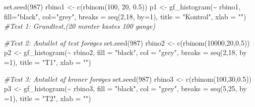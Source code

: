 \documentclass[
]{article}
\newenvironment{Shaded}{\begin{snugshade}}{\end{snugshade}}
\newcommand{\AttributeTok}[1]{\textcolor[rgb]{0.77,0.63,0.00}{#1}}
\newcommand{\CommentTok}[1]{\textcolor[rgb]{0.56,0.35,0.01}{\textit{#1}}}
\newcommand{\DecValTok}[1]{\textcolor[rgb]{0.00,0.00,0.81}{#1}}
\newcommand{\FloatTok}[1]{\textcolor[rgb]{0.00,0.00,0.81}{#1}}
\newcommand{\FunctionTok}[1]{\textcolor[rgb]{0.00,0.00,0.00}{#1}}
\newcommand{\NormalTok}[1]{#1}
\newcommand{\OtherTok}[1]{\textcolor[rgb]{0.56,0.35,0.01}{#1}}
\newcommand{\SpecialCharTok}[1]{\textcolor[rgb]{0.00,0.00,0.00}{#1}}
\newcommand{\StringTok}[1]{\textcolor[rgb]{0.31,0.60,0.02}{#1}}
\begin{document}
\begin{Shaded}
\begin{Highlighting}[]
\FunctionTok{set.seed}\NormalTok{(}\DecValTok{987}\NormalTok{)}
\NormalTok{rbino1 }\OtherTok{\textless{}{-}} \FunctionTok{c}\NormalTok{(}\FunctionTok{rbinom}\NormalTok{(}\DecValTok{100}\NormalTok{, }\DecValTok{20}\NormalTok{, }\FloatTok{0.5}\NormalTok{))}
\NormalTok{p1 }\OtherTok{\textless{}{-}} \FunctionTok{gf\_histogram}\NormalTok{(}\SpecialCharTok{\textasciitilde{}}\NormalTok{ rbino1, }\AttributeTok{fill=}\StringTok{"black"}\NormalTok{, }\AttributeTok{col=}\StringTok{"grey"}\NormalTok{, }\AttributeTok{breaks =} \FunctionTok{seq}\NormalTok{(}\DecValTok{2}\NormalTok{,}\DecValTok{18}\NormalTok{, }\AttributeTok{by=}\DecValTok{1}\NormalTok{), }\AttributeTok{title =} \StringTok{"Kontrol"}\NormalTok{, }\AttributeTok{xlab =} \StringTok{""}\NormalTok{) }\CommentTok{\#Test 1: Grundtest,(20 mønter kastes 100 gange)}


\CommentTok{\#Test 2: Antallet af test forøges}
\FunctionTok{set.seed}\NormalTok{(}\DecValTok{987}\NormalTok{)}
\NormalTok{rbino2 }\OtherTok{\textless{}{-}} \FunctionTok{c}\NormalTok{(}\FunctionTok{rbinom}\NormalTok{(}\DecValTok{10000}\NormalTok{,}\DecValTok{20}\NormalTok{,}\FloatTok{0.5}\NormalTok{))}
\NormalTok{p2 }\OtherTok{\textless{}{-}} \FunctionTok{gf\_histogram}\NormalTok{(}\SpecialCharTok{\textasciitilde{}}\NormalTok{ rbino2, }\AttributeTok{fill =} \StringTok{"black"}\NormalTok{, }\AttributeTok{col =} \StringTok{"grey"}\NormalTok{, }\AttributeTok{breaks =} \FunctionTok{seq}\NormalTok{(}\DecValTok{2}\NormalTok{,}\DecValTok{18}\NormalTok{, }\AttributeTok{by =}\DecValTok{1}\NormalTok{), }\AttributeTok{title =} \StringTok{"T1"}\NormalTok{, }\AttributeTok{xlab =} \StringTok{""}\NormalTok{) }

\CommentTok{\#Test 3: Antallet af kroner forøges}
\FunctionTok{set.seed}\NormalTok{(}\DecValTok{987}\NormalTok{)}
\NormalTok{rbino3 }\OtherTok{\textless{}{-}} \FunctionTok{c}\NormalTok{(}\FunctionTok{rbinom}\NormalTok{(}\DecValTok{100}\NormalTok{,}\DecValTok{30}\NormalTok{,}\FloatTok{0.5}\NormalTok{))}
\NormalTok{p3 }\OtherTok{\textless{}{-}} \FunctionTok{gf\_histogram}\NormalTok{(}\SpecialCharTok{\textasciitilde{}}\NormalTok{ rbino3, }\AttributeTok{fill =} \StringTok{"black"}\NormalTok{, }\AttributeTok{col =} \StringTok{"grey"}\NormalTok{, }\AttributeTok{breaks =} \FunctionTok{seq}\NormalTok{(}\DecValTok{5}\NormalTok{,}\DecValTok{25}\NormalTok{, }\AttributeTok{by =}\DecValTok{1}\NormalTok{), }\AttributeTok{title =} \StringTok{"T2"}\NormalTok{, }\AttributeTok{xlab =} \StringTok{""}\NormalTok{) }


\end{Highlighting}
\end{Shaded}
\end{document}

